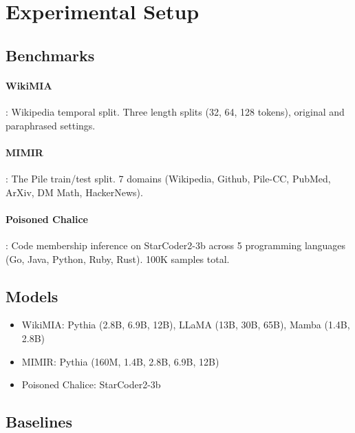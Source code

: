 \documentclass[11pt]{article}
\begin{document}
\section{Experimental Setup}
\label{sec:setup}

\subsection{Benchmarks}

\paragraph{WikiMIA} \citep{shi2024detecting}: Wikipedia temporal split. Three length splits (32, 64, 128 tokens), original and paraphrased settings.

\paragraph{MIMIR} \citep{duan2024membership}: The Pile train/test split. 7 domains (Wikipedia, Github, Pile-CC, PubMed, ArXiv, DM Math, HackerNews).

\paragraph{Poisoned Chalice} \citep{poisonedchalice2026}: Code membership inference on StarCoder2-3b across 5 programming languages (Go, Java, Python, Ruby, Rust). 100K samples total.

\subsection{Models}

\begin{itemize}
    \item WikiMIA: Pythia (2.8B, 6.9B, 12B), LLaMA (13B, 30B, 65B), Mamba (1.4B, 2.8B)
    \item MIMIR: Pythia (160M, 1.4B, 2.8B, 6.9B, 12B)
    \item Poisoned Chalice: StarCoder2-3b
\end{itemize}

\subsection{Baselines}
\end{document}
